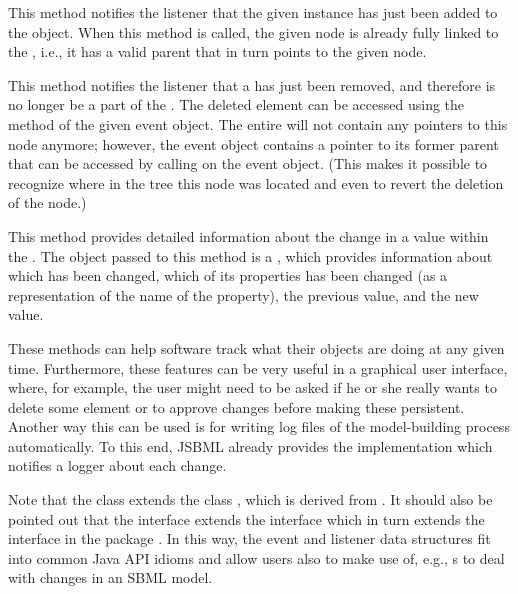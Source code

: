 \begin{description}[font=\normalfont]

\item[\code{nodeAdded(TreeNode node)}:] This method notifies the listener
  that the given \TreeNode instance has just been added to the \SBMLDocument
  object. When this method is called, the given node is already fully linked
  to the \SBMLDocument, i.e., it has a valid parent that in turn points to
  the given node.

\item[\code{nodeRemoved(TreeNodeRemoveEvent evt)}:] This method notifies the listener
  that a \TreeNode has just been removed, and therefore is
  no longer be a part of the \SBMLDocument. The deleted element can be accessed 
  using the  method of the given event object. The entire 
  \SBMLDocument will not contain any
  pointers to this node anymore; however, the event object contains
  a pointer to its former parent that can be accessed by calling 
  on the event object. (This makes it possible to recognize where
  in the tree this node was located and even to revert the deletion of the
  node.)

\item[\code{propertyChange(PropertyChangeEvent evt)}:] This method
  provides detailed information about the change in a value within the
  \SBMLDocument.  The object passed to this method is a
  \TreeNodeChangeEvent, which provides information about which \TreeNode
  has been changed, which of its properties has been changed (as a
  \String representation of the name of the property), the previous value,
  and the new value.

\end{description}

These methods can help software track what their \SBMLDocument objects are
doing at any given time.  Furthermore, these features can be very useful in
a graphical user interface, where, for
example, the user might need to be asked if he or she really wants to
delete some element or to approve changes before making these
persistent. Another way this can be used is for writing log
files of the model-building  process
automatically. To this end, JSBML already provides the implementation
\SimpleTreeNodeChangeListener{}  which notifies a logger about each change.

Note that the class \TreeNodeChangeEvent extends the class
,
 which is
derived from
.
It should also be pointed out that the interface \TreeNodeChangeListener
extends the interface 
 which in
turn extends the interface \EventListener in the package
. In this way, the event and listener data structures fit
into common Java API idioms 
and allow users also to make use of, e.g., \EventHandler{}s to deal with
changes in an SBML model.

